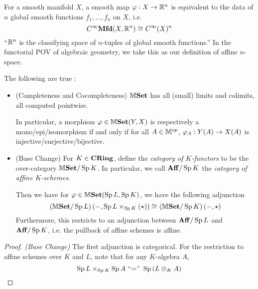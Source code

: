 \documentclass[../main.tex]{subfiles}
\begin{document}
\begin{rmk}
  
  For a smooth manifold $X$, 
  a smooth map $\varphi : X \to \mathbb{R}^n$ is equivalent to the 
  data of $n$ global smooth functions $f_1,\dots,f_n$ on $X$, 
  i.e. \[
    C^\infty\mathbf{Mfd}(X,\mathbb{R}^n) \cong_{} C^\infty(X)^n
  \]
  ``$\mathbb{R}^n$ is the classifying space of $n$-tuples of global smooth functions.''
  In the functorial POV of algebraic geometry, 
  we take this as our definition of affine $n$-space.

\end{rmk}

\begin{prop}
  
  The following are true : 
  \begin{itemize}
    \item (Completeness and Cocompleteness)
    $\mathbb{M}\mathbf{Set}$ has all (small) limits and colimits,
    all computed pointwise. 

    In particular, a morphism $\varphi \in \mathbb{M}\mathbf{Set}(Y,X)$ is 
    respectively a mono/epi/isomorphism if and only if 
    for all $A \in \mathbb{M}^{op}$, $\varphi_A : Y(A) \to X(A)$ is 
    injective/surjective/bijective.
    \item (Base Change)
    For $K \in \mathbf{CRing}$,
    define the \emph{category of $K$-functors} to be 
    the over-category $\mathbb{M}\mathbf{Set}/\operatorname{Sp} K$.
    In particular, we call $\mathbf{Aff}/\operatorname{Sp} K$ the 
    \emph{category of affine $K$-schemes}.

    Then we have for $\varphi \in \mathbb{M}\mathbf{Set}(\operatorname{Sp} L,\operatorname{Sp} K)$,
    we have the following adjunction \[
      \left(\mathbb{M}\mathbf{Set}/\operatorname{Sp} L\right) (-,\operatorname{Sp} L \times_{\operatorname{Sp} K} (\star)) \cong_{} 
      \left(\mathbb{M}\mathbf{Set}/\operatorname{Sp} K\right) (-,\star)
    \]
    Furthermore, this restricts to an adjunction between 
    $\mathbf{Aff}/\operatorname{Sp} L$ and $\mathbf{Aff}/\operatorname{Sp} K$,
    i.e. the pullback of affine schemes is affine.
  \end{itemize}
\end{prop}
\begin{proof}
  \textit{(Base Change)}
  The first adjunction is categorical. 
  For the restriction to affine schemes over $K$ and $L$,
  note that for any $K$-algebra $A$,
  \[
    \operatorname{Sp} L \times_{\operatorname{Sp} K} \operatorname{Sp} A \text{ ``='' } \operatorname{Sp} \left(L\otimes_K A\right)
  \]
\end{proof}
\end{document}
